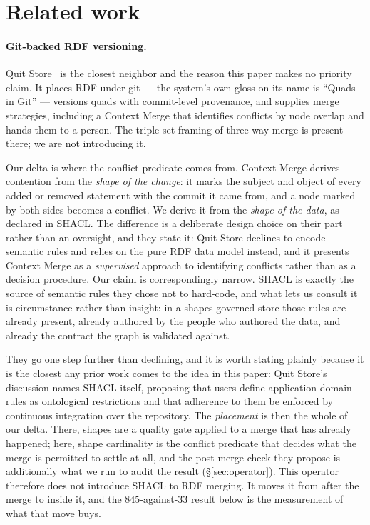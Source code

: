 \section{Related work}
\label{sec:related}

\paragraph{Git-backed RDF versioning.} Quit Store~\cite{arndt2019quit} is the
closest neighbor and the reason this paper makes no priority claim. It places
RDF under git --- the system's own gloss on its name is ``Quads in Git'' ---
versions quads with commit-level provenance, and supplies merge strategies,
including a Context Merge that identifies conflicts by node overlap and hands
them to a person. The triple-set framing of three-way merge is present there; we
are not introducing it.

Our delta is where the conflict predicate comes from. Context Merge derives
contention from the \emph{shape of the change}: it marks the subject and object
of every added or removed statement with the commit it came from, and a node
marked by both sides becomes a conflict. We derive it from the \emph{shape of
the data}, as declared in SHACL. The difference is a deliberate design choice on
their part rather than an oversight, and they state it: Quit Store declines to
encode semantic rules and relies on the pure RDF data model instead, and it
presents Context Merge as a \emph{supervised} approach to identifying conflicts
rather than as a decision procedure. Our claim is correspondingly narrow. SHACL
is exactly the source of semantic rules they chose not to hard-code, and what
lets us consult it is circumstance rather than insight: in a shapes-governed
store those rules are already present, already authored by the people who
authored the data, and already the contract the graph is validated against.

They go one step further than declining, and it is worth stating plainly because
it is the closest any prior work comes to the idea in this paper: Quit Store's
discussion names SHACL itself, proposing that users define application-domain
rules as ontological restrictions and that adherence to them be enforced by
continuous integration over the repository. The \emph{placement} is then the
whole of our delta. There, shapes are a quality gate applied to a merge that has
already happened; here, shape cardinality is the conflict predicate that decides
what the merge is permitted to settle at all, and the post-merge check they
propose is additionally what we run to audit the result
(\S\ref{sec:operator}). This operator therefore does not introduce SHACL to RDF
merging. It moves it from after the merge to inside it, and the $845$-against-$33$
result below is the measurement of what that move buys.

